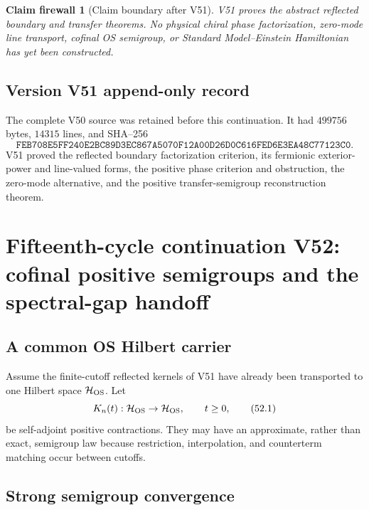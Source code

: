 \documentclass[11pt]{article}
\newtheorem{firewall}[theorem]{Claim firewall}
\theoremstyle{remark}
\begin{document}
\begin{firewall}[Claim boundary after V51]
\label{fire:v15v51}
V51 proves the abstract reflected boundary and transfer theorems.
No physical chiral phase factorization, zero-mode line transport,
cofinal OS semigroup, or Standard Model--Einstein Hamiltonian has
yet been constructed.
\end{firewall}

\section*{Version V51 append-only record}
The complete V50 source was retained before this continuation.  It
had \(499756\) bytes, \(14315\) lines, and SHA--256
\[
 \texttt{FEB708E5FF240E2BC89D3EC867A5070F12A00D26D0C616FED6E3EA48C77123C0}.
\]
V51 proved the reflected boundary factorization criterion, its
fermionic exterior-power and line-valued forms, the positive phase
criterion and obstruction, the zero-mode alternative, and the
positive transfer-semigroup reconstruction theorem.

\chapter{Fifteenth-cycle continuation V52: cofinal positive semigroups and the spectral-gap handoff}
\label{sec:v15v52}

\section{A common OS Hilbert carrier}

Assume the finite-cutoff reflected kernels of V51 have already been
transported to one Hilbert space \({\cal H}_{\rm OS}\).  Let
\[
 K_n(t):{\cal H}_{\rm OS}\to{\cal H}_{\rm OS},
 \qquad t\geq0,                                          \tag{52.1}
\]
be self-adjoint positive contractions.  They may have an
approximate, rather than exact, semigroup law because restriction,
interpolation, and counterterm matching occur between cutoffs.

\section{Strong semigroup convergence}
\end{document}
